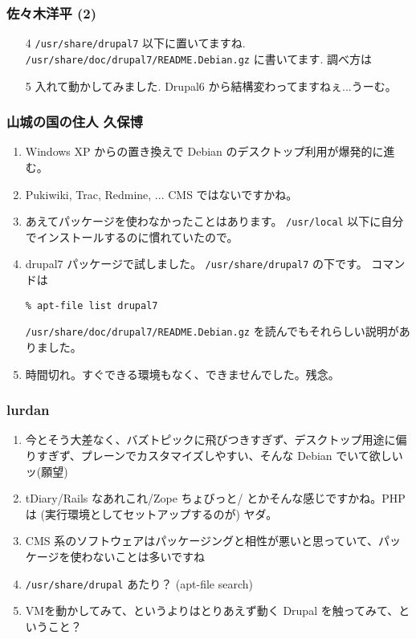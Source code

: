\documentclass[cjk,dvipdfmx,10pt,compress,%
hyperref={bookmarks=true,bookmarksnumbered=true,bookmarksopen=false,%
colorlinks=false,%
pdftitle={第 68 回 関西 Debian 勉強会},%
pdfauthor={倉敷・のがた・佐々木・かわだ},%
pdfsubject={資料},%
}]{beamer}
\begin{document}
\begin{frame}[fragile]
  \frametitle{ 佐々木洋平 (2)}
  \begin{enumerate}
  \item[4] {\tt /usr/share/drupal7} 以下に置いてますね. {\tt /usr/share/doc/drupal7/README.Debian.gz} に書いてます. 調べ方は
  \item[5] 入れて動かしてみました. Drupal6 から結構変わってますねぇ...うーむ。
  \end{enumerate}
\end{frame}


\begin{frame}
  \frametitle{ 山城の国の住人 久保博 }
  \begin{enumerate}
  \item Windows XP からの置き換えで Debian のデスクトップ利用が爆発的に進む。
  \item Pukiwiki, Trac, Redmine, ... CMS ではないですかね。
  \item あえてパッケージを使わなかったことはあります。 {\tt /usr/local} 以下に自分でインストールするのに慣れていたので。
  \item drupal7 パッケージで試しました。 {\tt /usr/share/drupal7} の下です。
    コマンドは

{\tt \% apt-file list drupal7}

    {\tt /usr/share/doc/drupal7/README.Debian.gz} を読んでもそれらしい説明がありました。
  \item 時間切れ。すぐできる環境もなく、できませんでした。残念。
  \end{enumerate}
\end{frame}

\begin{frame}
  \frametitle{ lurdan }
  \begin{enumerate}
  \item 今とそう大差なく、バズトピックに飛びつきすぎず、デスクトップ用途に偏りすぎず、プレーンでカスタマイズしやすい、そんな Debian でいて欲しいッ(願望)
  \item tDiary/Rails なあれこれ/Zope ちょびっと/ とかそんな感じですかね。PHP は (実行環境としてセットアップするのが) ヤダ。
  \item CMS 系のソフトウェアはパッケージングと相性が悪いと思っていて、パッケージを使わないことは多いですね
  \item {\tt /usr/share/drupal} あたり？ (apt-file search)
  \item VMを動かしてみて、というよりはとりあえず動く Drupal を触ってみて、ということ？
  \end{enumerate}
\end{frame}
\end{document}
